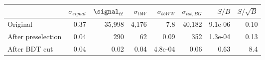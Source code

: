 \begin{tabular}{lrrrrrrr}
\toprule
{} &  $\sigma_{signal}$ &  $\signal_{tt}$ &  $\sigma_{tbW}$ &  $\sigma_{bbWW}$ &  $\sigma_{tot,BG}$ &   $S/B$ &  $S/\sqrt{B}$ \\
\midrule
Original           &               0.37 &          35,998 &           4,176 &              7.8 &             40,182 & 9.1e-06 &          0.10 \\
After preselection &               0.04 &             290 &              62 &             0.09 &                352 & 1.3e-04 &          0.13 \\
After BDT cut      &               0.04 &            0.02 &            0.04 &          4.8e-04 &               0.06 &    0.63 &           8.4 \\
\bottomrule
\end{tabular}
